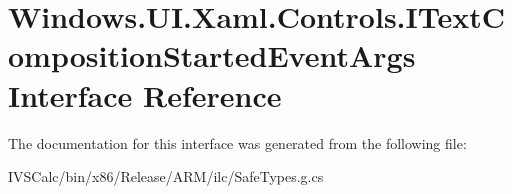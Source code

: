 \hypertarget{interface_windows_1_1_u_i_1_1_xaml_1_1_controls_1_1_i_text_composition_started_event_args}{}\section{Windows.\+U\+I.\+Xaml.\+Controls.\+I\+Text\+Composition\+Started\+Event\+Args Interface Reference}
\label{interface_windows_1_1_u_i_1_1_xaml_1_1_controls_1_1_i_text_composition_started_event_args}


The documentation for this interface was generated from the following file\+:\begin{DoxyCompactItemize}
\item 
I\+V\+S\+Calc/bin/x86/\+Release/\+A\+R\+M/ilc/Safe\+Types.\+g.\+cs\end{DoxyCompactItemize}
